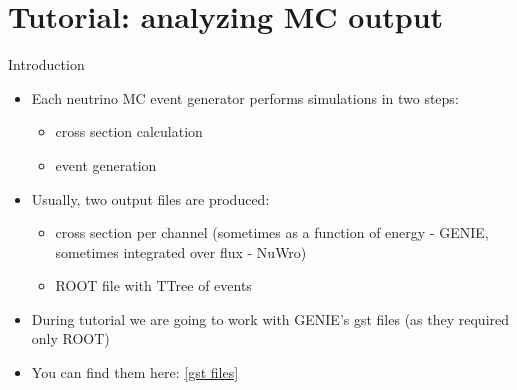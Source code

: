 \section[toc=Tutorial generators]{Tutorial: analyzing MC output}

\begin{slide}{Introduction}
\null\vfill

  \begin{itemize}
   
    \item Each neutrino MC event generator performs simulations in two steps:
    
    \begin{itemize}
      \item cross section calculation
      \item event generation
    \end{itemize}
    
    \item Usually, two output files are produced:
    
    \begin{itemize}
     \item cross section per channel (sometimes as a function of energy - GENIE, sometimes integrated over flux - NuWro)
     \item ROOT file with TTree of events
    \end{itemize}
    
    \item During tutorial we are going to work with GENIE's gst files (as they required only ROOT)
    
    \item You can find them here: \href{http://home.fnal.gov/~goran/NUSTEC_tutorial/}{[gst files]}
    
  \end{itemize}

\vfill\null
\end{slide}